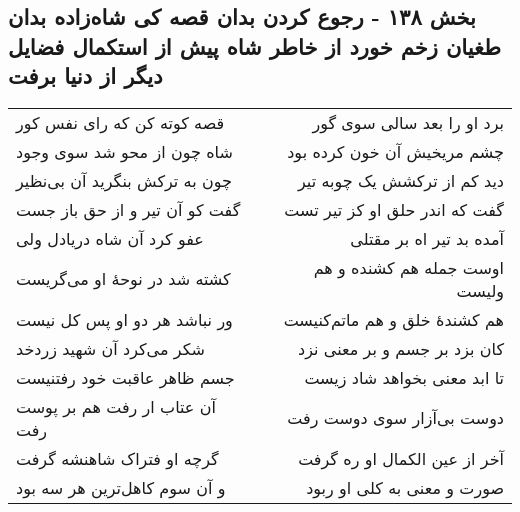 \begin{center}
\section*{بخش ۱۳۸ - رجوع کردن بدان قصه کی شاه‌زاده بدان طغیان زخم خورد از خاطر شاه پیش از استکمال فضایل دیگر از دنیا برفت}
\label{sec:sh138}
\begin{longtable}{l p{0.5cm} r}
قصه کوته کن که رای نفس کور
&&
برد او را بعد سالی سوی گور
\\
شاه چون از محو شد سوی وجود
&&
چشم مریخیش آن خون کرده بود
\\
چون به ترکش بنگرید آن بی‌نظیر
&&
دید کم از ترکشش یک چوبه تیر
\\
گفت کو آن تیر و از حق باز جست
&&
گفت که اندر حلق او کز تیر تست
\\
عفو کرد آن شاه دریادل ولی
&&
آمده بد تیر اه بر مقتلی
\\
کشته شد در نوحهٔ او می‌گریست
&&
اوست جمله هم کشنده و هم ولیست
\\
ور نباشد هر دو او پس کل نیست
&&
هم کشندهٔ خلق و هم ماتم‌کنیست
\\
شکر می‌کرد آن شهید زردخد
&&
کان بزد بر جسم و بر معنی نزد
\\
جسم ظاهر عاقبت خود رفتنیست
&&
تا ابد معنی بخواهد شاد زیست
\\
آن عتاب ار رفت هم بر پوست رفت
&&
دوست بی‌آزار سوی دوست رفت
\\
گرچه او فتراک شاهنشه گرفت
&&
آخر از عین الکمال او ره گرفت
\\
و آن سوم کاهل‌ترین هر سه بود
&&
صورت و معنی به کلی او ربود
\\
\end{longtable}
\end{center}
